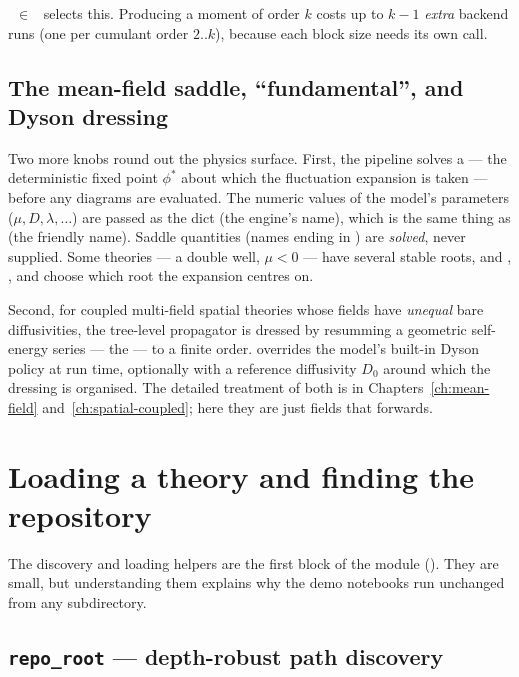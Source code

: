 ~$\in$~
selects this. Producing a moment of order $k$ costs up to $k-1$ \emph{extra}
backend runs (one per cumulant order $2..k$), because each block size needs its
own  call.

\subsection{The mean-field saddle, ``fundamental'', and Dyson dressing}

Two more knobs round out the physics surface. First, the pipeline solves a
 --- the deterministic fixed point $\phi^{*}$ about which
the fluctuation expansion is taken --- before any diagrams are evaluated. The
numeric values of the model's parameters ($\mu, D, \lambda, \ldots$) are passed as
the  dict (the engine's name), which is the same thing as
 (the friendly name). Saddle quantities (names ending in
) are \emph{solved}, never supplied. Some theories --- a double well,
$\mu<0$ --- have several stable roots, and ,
, and  choose which root the
expansion centres on.

Second, for coupled multi-field spatial theories whose fields have \emph{unequal}
bare diffusivities, the tree-level propagator is dressed by resumming a geometric
self-energy series --- the  --- to a finite order.
 overrides the model's built-in Dyson policy at run
time, optionally with a reference diffusivity $D_0$ around which the dressing is
organised. The detailed treatment of both is in Chapters~\ref{ch:mean-field}
and~\ref{ch:spatial-coupled}; here they are just  fields that
 forwards.

\section{Loading a theory and finding the repository}

The discovery and loading helpers are the first block of the module
(). They are small, but understanding them
explains why the demo notebooks run unchanged from any subdirectory.

\subsection{\texttt{repo\_root} --- depth-robust path discovery}

